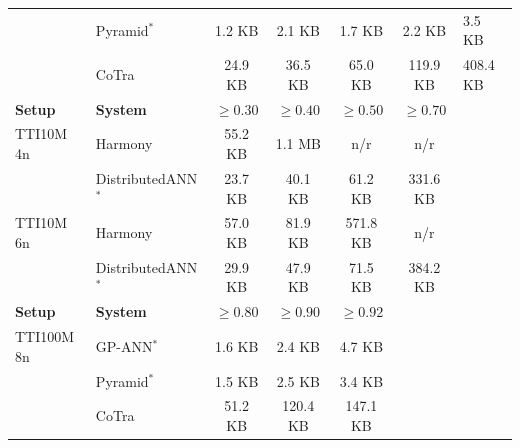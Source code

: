 \begin{table}[t]
\begin{tabular}{llcccc}
 & Pyramid$^*$ & 1.2 KB & 2.1 KB & 1.7 KB & 2.2 KB & 3.5 KB \\
 & CoTra & 24.9 KB & 36.5 KB & 65.0 KB & 119.9 KB & 408.4 KB \\
\midrule
\textbf{Setup} & \textbf{System} & $\geq 0.30$ & $\geq 0.40$ & $\geq 0.50$ & $\geq 0.70$ \\
\midrule
TTI10M 4n & Harmony & 55.2 KB & 1.1 MB & n/r & n/r \\
 & DistributedANN$^*$ & 23.7 KB & 40.1 KB & 61.2 KB & 331.6 KB \\
\addlinespace
TTI10M 6n & Harmony & 57.0 KB & 81.9 KB & 571.8 KB & n/r \\
 & DistributedANN$^*$ & 29.9 KB & 47.9 KB & 71.5 KB & 384.2 KB \\
\midrule
\textbf{Setup} & \textbf{System} & $\geq 0.80$ & $\geq 0.90$ & $\geq 0.92$ &  \\
\midrule
TTI100M 8n & GP-ANN$^*$ & 1.6 KB & 2.4 KB & 4.7 KB &  \\
 & Pyramid$^*$ & 1.5 KB & 2.5 KB & 3.4 KB &  \\
 & CoTra & 51.2 KB & 120.4 KB & 147.1 KB &  \\
\bottomrule
\end{tabular}
\end{table}
